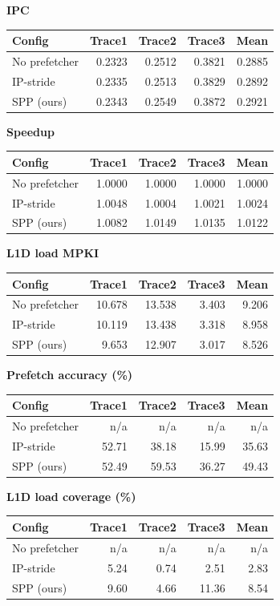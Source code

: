 \textbf{IPC}\\[2pt]
\begin{tabular}{lrrrr}\toprule
Config & Trace1 & Trace2 & Trace3 & Mean \\ \midrule
No prefetcher & 0.2323 & 0.2512 & 0.3821 & 0.2885 \\
IP-stride & 0.2335 & 0.2513 & 0.3829 & 0.2892 \\
SPP (ours) & 0.2343 & 0.2549 & 0.3872 & 0.2921 \\
\bottomrule\end{tabular}
\medskip

\textbf{Speedup}\\[2pt]
\begin{tabular}{lrrrr}\toprule
Config & Trace1 & Trace2 & Trace3 & Mean \\ \midrule
No prefetcher & 1.0000 & 1.0000 & 1.0000 & 1.0000 \\
IP-stride & 1.0048 & 1.0004 & 1.0021 & 1.0024 \\
SPP (ours) & 1.0082 & 1.0149 & 1.0135 & 1.0122 \\
\bottomrule\end{tabular}
\medskip

\textbf{L1D load MPKI}\\[2pt]
\begin{tabular}{lrrrr}\toprule
Config & Trace1 & Trace2 & Trace3 & Mean \\ \midrule
No prefetcher & 10.678 & 13.538 & 3.403 & 9.206 \\
IP-stride & 10.119 & 13.438 & 3.318 & 8.958 \\
SPP (ours) & 9.653 & 12.907 & 3.017 & 8.526 \\
\bottomrule\end{tabular}
\medskip

\textbf{Prefetch accuracy (\%)}\\[2pt]
\begin{tabular}{lrrrr}\toprule
Config & Trace1 & Trace2 & Trace3 & Mean \\ \midrule
No prefetcher & n/a & n/a & n/a & n/a \\
IP-stride & 52.71 & 38.18 & 15.99 & 35.63 \\
SPP (ours) & 52.49 & 59.53 & 36.27 & 49.43 \\
\bottomrule\end{tabular}
\medskip

\textbf{L1D load coverage (\%)}\\[2pt]
\begin{tabular}{lrrrr}\toprule
Config & Trace1 & Trace2 & Trace3 & Mean \\ \midrule
No prefetcher & n/a & n/a & n/a & n/a \\
IP-stride & 5.24 & 0.74 & 2.51 & 2.83 \\
SPP (ours) & 9.60 & 4.66 & 11.36 & 8.54 \\
\bottomrule\end{tabular}
\medskip
